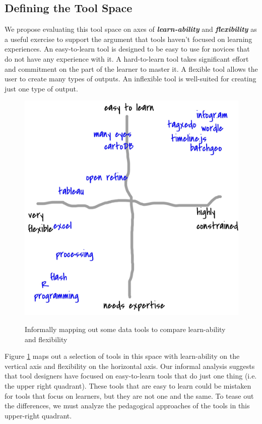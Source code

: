 \documentclass{acm_proc_article-sp}
\begin{document}
\subsection{Defining the Tool Space}

We propose evaluating this tool space on axes of  \textbf{\textit{learn-ability}} and \textbf{\textit{flexibility}} as a useful exercise to support the argument that tools haven't focused on learning experiences.  An easy-to-learn tool is designed to be easy to use for novices that do not have any experience with it.  A hard-to-learn tool takes significant effort and commitment on the part of the learner to master it.  A flexible tool allows the user to create many types of outputs.  An inflexible tool is well-suited for creating just one type of output.

\begin{figure}[h]
\caption{Informally mapping out some data tools to compare learn-ability and flexibility}
\includegraphics[width=\linewidth]{tool-matrix}
\label{fig:tool-matrix}
\end{figure}

Figure \ref{fig:tool-matrix} maps out a selection of tools in this space with learn-ability on the vertical axis and flexibility on the horizontal axis. Our informal analysis suggests that tool designers have focused on easy-to-learn tools that do just one thing (i.e. the upper right quadrant).  These tools that are easy to learn could be mistaken for tools that focus on learners, but they are not one and the same. To tease out the differences, we must analyze the pedagogical approaches of the tools in this upper-right quadrant.
\end{document}
